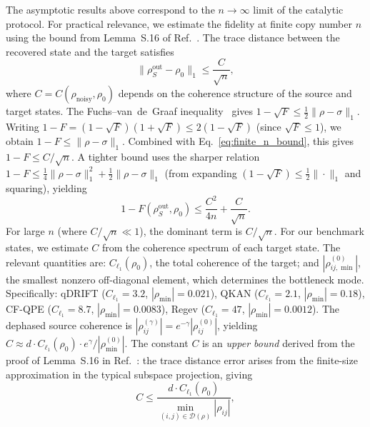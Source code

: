 \documentclass[prx,twocolumn,superscriptaddress,longbibliography,floatfix]{revtex4-2}
\begin{document}
The asymptotic results above correspond to the $n \to \infty$ limit of the catalytic protocol.
For practical relevance, we estimate the fidelity at finite copy number $n$ using the bound from Lemma~S.16 of Ref.~\cite{Shiraishi2024}.
The trace distance between the recovered state and the target satisfies
\begin{equation}
\|\rho_S^\mathrm{out} - \rho_0\|_1 \leq \frac{C}{\sqrt{n}},
\label{eq:finite_n_bound}
\end{equation}
where $C = C(\rho_\mathrm{noisy}, \rho_0)$ depends on the coherence structure of the source and target states.
The Fuchs--van~de~Graaf inequality~\cite{NielsenChuang2010} gives $1 - \sqrt{F} \leq \frac{1}{2}\|\rho - \sigma\|_1$.
Writing $1 - F = (1 - \sqrt{F})(1 + \sqrt{F}) \leq 2(1 - \sqrt{F})$ (since $\sqrt{F} \leq 1$), we obtain $1 - F \leq \|\rho - \sigma\|_1$.
Combined with Eq.~\eqref{eq:finite_n_bound}, this gives $1 - F \leq C/\sqrt{n}$.
A tighter bound uses the sharper relation $1 - F \leq \frac{1}{4}\|\rho - \sigma\|_1^2 + \frac{1}{2}\|\rho - \sigma\|_1$ (from expanding $(1 - \sqrt{F}) \leq \frac{1}{2}\|\cdot\|_1$ and squaring), yielding
\begin{equation}
1 - F(\rho_S^\mathrm{out}, \rho_0) \leq \frac{C^2}{4n} + \frac{C}{\sqrt{n}}.
\label{eq:finite_n_fidelity}
\end{equation}
For large $n$ (where $C/\sqrt{n} \ll 1$), the dominant term is $C/\sqrt{n}$.
For our benchmark states, we estimate $C$ from the coherence spectrum of each target state.
The relevant quantities are: $C_{\ell_1}(\rho_0)$, the total coherence of the target; and $|\rho_{ij,\min}^{(0)}|$, the smallest nonzero off-diagonal element, which determines the bottleneck mode.
Specifically: qDRIFT ($C_{\ell_1} = 3.2$, $|\rho_\mathrm{min}| = 0.021$), QKAN ($C_{\ell_1} = 2.1$, $|\rho_\mathrm{min}| = 0.18$), CF-QPE ($C_{\ell_1} = 8.7$, $|\rho_\mathrm{min}| = 0.0083$), Regev ($C_{\ell_1} = 47$, $|\rho_\mathrm{min}| = 0.0012$).
The dephased source coherence is $|\rho_{ij}^{(\gamma)}| = e^{-\gamma}|\rho_{ij}^{(0)}|$, yielding $C \approx d \cdot C_{\ell_1}(\rho_0) \cdot e^\gamma / |\rho_\mathrm{min}^{(0)}|$.
The constant $C$ is an \emph{upper bound} derived from the proof of Lemma~S.16 in Ref.~\cite{Shiraishi2024}: the trace distance error arises from the finite-size approximation in the typical subspace projection, giving
\begin{equation}
C \leq \frac{d \cdot C_{\ell_1}(\rho_0)}{\displaystyle\min_{(i,j) \in \mathcal{D}(\rho)} |\rho_{ij}|},
\label{eq:C_bound}
\end{equation}
\end{document}
